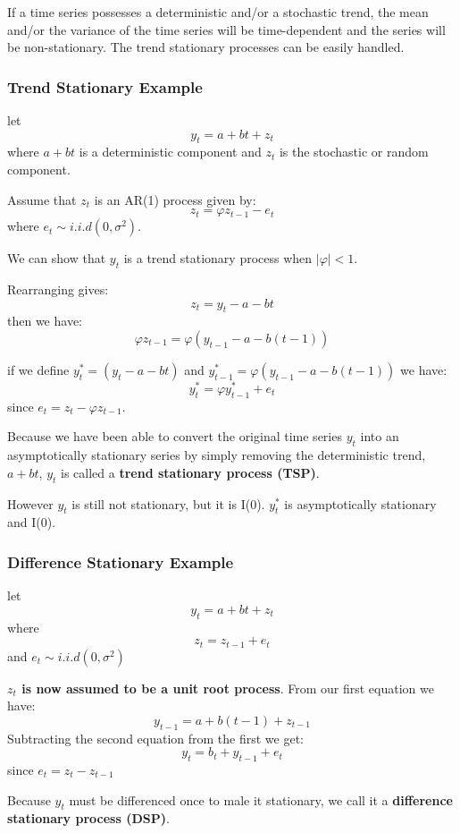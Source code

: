 \documentclass[11pt]{article}
\begin{document}
If a time series possesses a deterministic and/or a stochastic trend, the mean and/or the variance of the time series will be time-dependent and the series will be non-stationary. The trend stationary processes can be easily handled.

\begin{mdframed}
\subsubsection{Trend Stationary Example}
let
\[y_t = a + bt + z_t\]
where $a+bt$ is a deterministic component and $z_t$ is the stochastic or random component.

Assume that $z_t$ is an AR(1) process given by:
\[z_t = \varphi z_{t-1} - e_t\]
where $e_t \sim i.i.d(0, \sigma^2)$.

We can show that $y_t$ is a trend stationary process when $|\varphi|<1$.

Rearranging gives:
\[z_t = y_t - a - bt\]
then we have:
\[\varphi z_{t-1} = \varphi (y_{t-1} - a - b(t-1))\]

if we define $y^*_t = (y_t-a-bt)$ and $y_{t-1}^* = \varphi(y_{t-1}-a-b(t-1))$ we have:
\[y_t^* = \varphi y_{t-1}^* + e_t\]
since $e_t = z_t - \varphi z_{t-1}$.
\end{mdframed}

Because we have been able to convert the original time series $y_t$ into an asymptotically stationary series by simply removing the deterministic trend, $a+bt$, $y_t$ is called a \textbf{trend stationary process (TSP)}.

However $y_t$ is still not stationary, but it is I(0). $y^*_t$ is asymptotically stationary and I(0).


\begin{mdframed}
\subsubsection{Difference Stationary Example}

let
\[y_t = a +bt + z_t\]
where 
\[z_t = z_{t-1} + e_t\]
and $e_t \sim i.i.d(0,\sigma^2)$

\textbf{$z_t$ is now assumed to be a unit root process}. From our first equation we have:
\[y_{t-1} = a+b(t-1) + z_{t-1}\]
Subtracting the second equation from the first we get:
\[y_t = b_t + y_{t-1} + e_t\]
since $e_t = z_t - z_{t-1}$
\end{mdframed}
Because $y_t$ must be differenced once to male it stationary, we call it a \textbf{difference stationary process (DSP)}.
\end{document}
